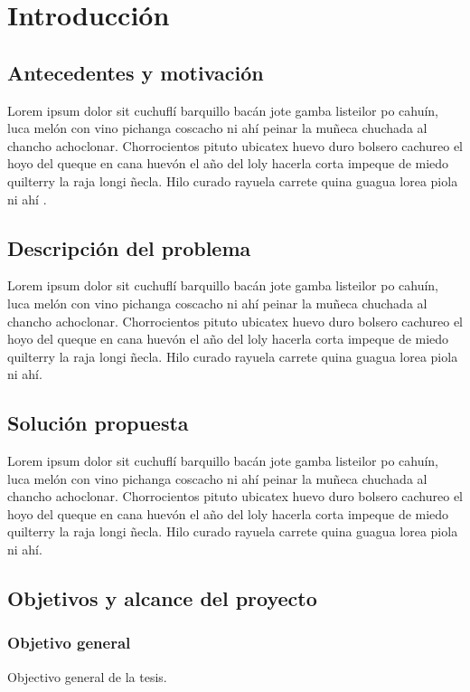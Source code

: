 \chapter{Introducción}
\label{cap:introduccion}

\section{Antecedentes y motivación}
\label{intro:motivacion}
{\normalsize Lorem ipsum dolor sit cuchuflí barquillo bacán jote gamba listeilor po cahuín, luca melón con vino pichanga coscacho ni ahí peinar la muñeca chuchada al chancho achoclonar. Chorrocientos pituto ubicatex huevo duro bolsero cachureo el hoyo del queque en cana huevón el año del loly hacerla corta impeque de miedo quilterry la raja longi ñecla. Hilo curado rayuela carrete quina guagua lorea piola ni ahí \citep{Codishetal2000}}.

\section{Descripción del problema}
\label{intro:problema}
Lorem ipsum dolor sit cuchuflí barquillo bacán jote gamba listeilor po cahuín, luca melón con vino pichanga coscacho ni ahí peinar la muñeca chuchada al chancho achoclonar. Chorrocientos pituto ubicatex huevo duro bolsero cachureo el hoyo del queque en cana huevón el año del loly hacerla corta impeque de miedo quilterry la raja longi ñecla. Hilo curado rayuela carrete quina guagua lorea piola ni ahí.

\section{Solución propuesta}
\label{intro:solucion}
Lorem ipsum dolor sit cuchuflí barquillo bacán jote gamba listeilor po cahuín, luca melón con vino pichanga coscacho ni ahí peinar la muñeca chuchada al chancho achoclonar. Chorrocientos pituto ubicatex huevo duro bolsero cachureo el hoyo del queque en cana huevón el año del loly hacerla corta impeque de miedo quilterry la raja longi ñecla. Hilo curado rayuela carrete quina guagua lorea piola ni ahí.


\section{Objetivos y alcance del proyecto}
\label{intro:objetivos}

\subsection{Objetivo general}
	Objectivo general de la tesis.

